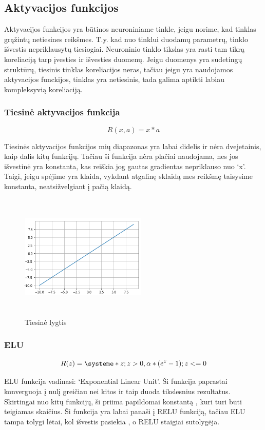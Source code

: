 \documentclass{VUMIFInfKursinis}
\begin{document}
\subsection{Aktyvacijos funkcijos}
\par
Aktyvacijos funkcijos yra būtinos neuroniniame tinkle, jeigu norime, kad tinklas
grąžintų netiesines reikšmes. T.y. kad nuo tinklui duodamų parametrų, tinklo išvestis
nepriklausytų tiesiogiai. \cite{salt18} Neuroninio tinklo tikslas yra rasti tam tikrą
koreliaciją tarp įvesties ir išvesties duomenų. Jeigu duomenys yra sudetingų struktūrų,
tiesinis tinklas koreliacijos neras, tačiau jeigu yra naudojamos aktyvacijos funckijos,
tinklas yra netiesinis, tada galima aptikti labiau kompleksyvią koreliaciją. \cite{salt18}

\subsubsection{Tiesinė aktyvacijos funkcija}
\[
R(x, a) = x * a
\]
\par
Tiesinės aktyvacijos funkcijos mių diapazonas yra labai didelis ir nėra dvejetainis,
kaip dalis kitų funkcijų. Tačiau ši funkcija nėra plačiai naudojama, nes jos
išvestinė yra konstanta, kas reiškia jog gautas gradientas nepriklauso nuo ‘x’.
Taigi, jeigu spėjime yra klaida, vykdant atgalinę sklaidą mes reikšmę taisysime
konstanta, neatsižvelgiant į pačią klaidą. \cite{salt16}

\begin{figure}[ht]
  \includegraphics[width=6cm,height=6cm,keepaspectratio]{tiesine.png}
  \caption{Tiesinė lygtis}
  \label{fig:lygtis1}
\end{figure}

\subsubsection{ELU}
\[
  R(z) = \systeme*{z; z > 0, \alpha*(e^z - 1); z <= 0}
\]
\par
ELU funkcija vadinasi: ‘Exponential Linear Unit’. Ši funkcija paprastai konverguoja į
nulį greičiau nei kitos ir taip duoda tikslesnius rezultatus. Skirtingai nuo kitų
funkcijų, ši priima papildomai konstantą , kuri turi būti teigiamas skaičius.
Ši funkcija yra labai panaši į RELU funkciją, tačiau ELU tampa tolygi lėtai,
kol išvestis pasiekia , o RELU staigiai sutolygėja. \cite{salt16}
\end{document}
